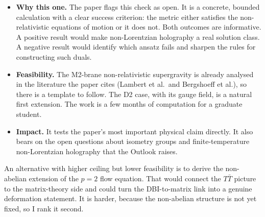 \documentclass[11pt]{article}
\begin{document}
\begin{itemize}
\item \textbf{Why this one.} The paper flags this check as open. It is a concrete, bounded calculation with a clear success criterion: the metric either satisfies the non-relativistic equations of motion or it does not. Both outcomes are informative. A positive result would make non-Lorentzian holography a real solution class. A negative result would identify which ansatz fails and sharpen the rules for constructing such duals.
\item \textbf{Feasibility.} The M2-brane non-relativistic supergravity is already analysed in the literature the paper cites (Lambert et al.\ and Bergshoeff et al.), so there is a template to follow. The D2 case, with its gauge field, is a natural first extension. The work is a few months of computation for a graduate student.
\item \textbf{Impact.} It tests the paper's most important physical claim directly. It also bears on the open questions about isometry groups and finite-temperature non-Lorentzian holography that the Outlook raises.
\end{itemize}

An alternative with higher ceiling but lower feasibility is to derive the non-abelian extension of the $p=2$ flow equation. That would connect the $T\bar T$ picture to the matrix-theory side and could turn the DBI-to-matrix link into a genuine deformation statement. It is harder, because the non-abelian structure is not yet fixed, so I rank it second.
\end{document}
